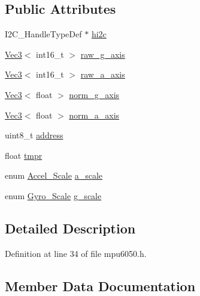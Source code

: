 \subsection*{Public Attributes}
\begin{DoxyCompactItemize}
\item 
I2\+C\+\_\+\+Handle\+Type\+Def $\ast$ \mbox{\hyperlink{struct_m_p_u6050_aa133576cdb5e081dfe9b0d1c3d168b31}{hi2c}}
\item 
\mbox{\hyperlink{class_vec3}{Vec3}}$<$ int16\+\_\+t $>$ \mbox{\hyperlink{struct_m_p_u6050_a94360a757c361c37d0af803beccaf7a0}{raw\+\_\+g\+\_\+axis}}
\item 
\mbox{\hyperlink{class_vec3}{Vec3}}$<$ int16\+\_\+t $>$ \mbox{\hyperlink{struct_m_p_u6050_a3fdc57285035d07790bfdd6ba22e7c1a}{raw\+\_\+a\+\_\+axis}}
\item 
\mbox{\hyperlink{class_vec3}{Vec3}}$<$ float $>$ \mbox{\hyperlink{struct_m_p_u6050_a408969ff3349bf750d25a043019ab813}{norm\+\_\+g\+\_\+axis}}
\item 
\mbox{\hyperlink{class_vec3}{Vec3}}$<$ float $>$ \mbox{\hyperlink{struct_m_p_u6050_a1448ddadf65cd8e48d3873e1fcb00b8b}{norm\+\_\+a\+\_\+axis}}
\item 
uint8\+\_\+t \mbox{\hyperlink{struct_m_p_u6050_a76ed3c7dd3e6980e8958c82ed4ebcaeb}{address}}
\item 
float \mbox{\hyperlink{struct_m_p_u6050_ab0ab95d9f8ac9cc71b578e780ee7288a}{tmpr}}
\item 
enum \mbox{\hyperlink{mpu6050_8h_ab2aa80c677de9888d409d544ddb4e7a6}{Accel\+\_\+\+Scale}} \mbox{\hyperlink{struct_m_p_u6050_ade2780c9d3540e41162e5441349c43cc}{a\+\_\+scale}}
\item 
enum \mbox{\hyperlink{mpu6050_8h_aafecca78685b4c6a67c94fcce77151d2}{Gyro\+\_\+\+Scale}} \mbox{\hyperlink{struct_m_p_u6050_a761521053ae5eeaaa06a96b0c15543bc}{g\+\_\+scale}}
\end{DoxyCompactItemize}


\subsection{Detailed Description}


Definition at line 34 of file mpu6050.\+h.



\subsection{Member Data Documentation}
\mbox{\label{struct_m_p_u6050_ade2780c9d3540e41162e5441349c43cc}} 
